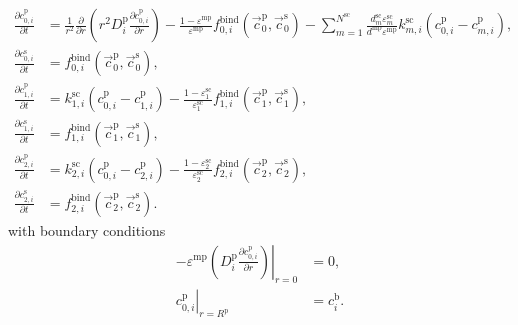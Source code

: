 \documentclass{article}
\begin{document}
\begin{align}
    \frac{\partial c^{\mathrm{p}}_{0,i}}{\partial t}
    &= \frac{1}{r^{2}} \frac{\partial }{\partial r} \left( r^{2} D^{\mathrm{p}}_{i} \frac{\partial c^{\mathrm{p}}_{0,i}}{\partial r} \right)
        - \frac{1 - \varepsilon^{\mathrm{mp}}}{\varepsilon^{\mathrm{mp}}}f^{\mathrm{bind}}_{0,i}\left( \vec{c}^{\mathrm{p}}_{0}, \vec{c}^{\mathrm{s}}_{0} \right)
        - \sum_{m=1}^{N^{\mathrm{sc}}} \frac{d^{\mathrm{sc}}_{m} \varepsilon^{\mathrm{sc}}_{m}}{d^{\mathrm{mp}} \varepsilon^{\mathrm{mp}}} k^{\mathrm{sc}}_{m,i} \left( c^{\mathrm{p}}_{0,i} - c^{\mathrm{p}}_{m,i} \right),
    \\
    \frac{\partial c^{\mathrm{s}}_{0,i}}{\partial t}
    &= f^{\mathrm{bind}}_{0,i}\left( \vec{c}^{\mathrm{p}}_{0}, \vec{c}^{\mathrm{s}}_{0} \right),
    \\
    \frac{\partial c^{\mathrm{p}}_{1,i}}{\partial t}
    &= k^{\mathrm{sc}}_{1,i} \left( c^{\mathrm{p}}_{0,i} - c^{\mathrm{p}}_{1,i} \right)
        - \frac{1 - \varepsilon^{\mathrm{sc}}_{1}}{\varepsilon^{\mathrm{sc}}_{1}} f^{\mathrm{bind}}_{1,i}\left( \vec{c}^{\mathrm{p}}_{1}, \vec{c}^{\mathrm{s}}_{1} \right),
    \\
    \frac{\partial c^{\mathrm{s}}_{1,i}}{\partial t}
    &= f^{\mathrm{bind}}_{1,i}\left( \vec{c}^{\mathrm{p}}_{1}, \vec{c}^{\mathrm{s}}_{1} \right),
    \\
    \frac{\partial c^{\mathrm{p}}_{2,i}}{\partial t}
    &= k^{\mathrm{sc}}_{2,i} \left( c^{\mathrm{p}}_{0,i} - c^{\mathrm{p}}_{2,i} \right)
        - \frac{1 - \varepsilon^{\mathrm{sc}}_{2}}{\varepsilon^{\mathrm{sc}}_{2}} f^{\mathrm{bind}}_{2,i}\left( \vec{c}^{\mathrm{p}}_{2}, \vec{c}^{\mathrm{s}}_{2} \right),
    \\
    \frac{\partial c^{\mathrm{s}}_{2,i}}{\partial t}
    &= f^{\mathrm{bind}}_{2,i}\left( \vec{c}^{\mathrm{p}}_{2}, \vec{c}^{\mathrm{s}}_{2} \right).
\end{align}
with boundary conditions
\begin{align}
    - \varepsilon^{\mathrm{mp}} \left. \left( D^{\mathrm{p}}_{i} \frac{\partial c^{\mathrm{p}}_{0,i}}{\partial r} \right) \right|_{r=0}
    &= 0,
    \\
    \left. c^{\mathrm{p}}_{0,i} \right|_{r = R^{\mathrm{p}}}
    &= c^{\mathrm{b}}_{i}.
\end{align}
\end{document}
